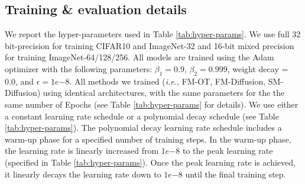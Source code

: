 \documentclass{article}
\makeatletter
\renewcommand*{\ie}{{\it i.e.}\@\xspace}
\makeatother
\begin{document}
\subsection{Training \& evaluation details}

\begin{table}
\centering
{}
\caption{Hyper-parameters used for training each model}
\label{tab:hyper-params}
\end{table}

We report the hyper-parameters used in Table \ref{tab:hyper-params}.  We use full 32 bit-precision for training CIFAR10 and ImageNet-32 and 16-bit mixed precision for training ImageNet-64/128/256.  All models are trained using the Adam optimizer with the following parameters: $\beta_1 = 0.9$, $\beta_2=0.999$, weight decay = 0.0, and $\epsilon = 1e{-8}$. All methods we trained (\ie, FM-OT, FM-Diffusion, SM-Diffusion) using  identical architectures, with the same parameters for the the same number of Epochs (see Table \ref{tab:hyper-params} for details).  We use either a constant learning rate schedule or a polynomial decay schedule (see Table \ref{tab:hyper-params}).  The polynomial decay learning rate schedule includes a warm-up phase for a specified number of training steps.  In the warm-up phase, the learning rate is linearly increased from $1e{-8}$ to the peak learning rate (specified in Table \ref{tab:hyper-params}).  Once the peak learning rate is achieved, it linearly decays the learning rate down to $1e{-8}$ until the final training step.
\end{document}
